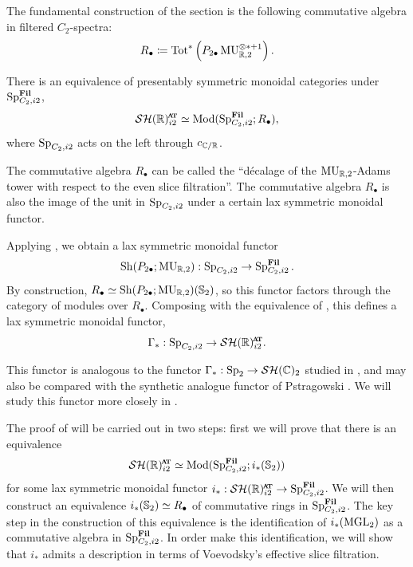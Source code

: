 The fundamental construction of the section is the following commutative algebra in filtered $C_2$-spectra:
\[ R_\bullet \coloneqq \mathrm{Tot}^* \left( P_{2\bullet} \operatorname{\mathrm{MU}}_{\mathbb{R},2}^{\otimes * + 1} \right). \]

\begin{thm} \label{thm:filt-model}
  There is an equivalence of presentably symmetric monoidal categories under $\operatorname{\mathrm{Sp}}_{C_2, i2} ^{\operatorname{\mathbf{Fil}}}$,
  \[\SHRat \simeq \Mod(\Sp^{\Fil}_{C_2, i2}; R_\bullet),\]
  where $\operatorname{\mathrm{Sp}}_{C_2, i2}$ acts on the left through $c_{\mathbb{C}/\mathbb{R}}$.
\end{thm}

The commutative algebra $R_\bullet$ can be called the ``d\'ecalage of the $\operatorname{\mathrm{MU}}_{\mathbb{R},2}$-Adams tower with respect to the even slice filtration''. The commutative algebra $R_\bullet$ is also the image of the unit in $\operatorname{\mathrm{Sp}}_{C_2,i2}$ under a certain lax symmetric monoidal functor.

\begin{cnstr} \label{cnstr:gamma-star}
  Applying , we obtain a lax symmetric monoidal functor
  \[ \mathrm{Sh}(P_{2\bullet} ; \operatorname{\mathrm{MU}}_{\mathbb{R},2}) : \operatorname{\mathrm{Sp}}_{C_2,i2} \to \operatorname{\mathrm{Sp}}^{\operatorname{\mathbf{Fil}}}_{C_2, i2}. \]
  By construction, $R_\bullet \simeq \mathrm{Sh}(P_{2\bullet} ; \operatorname{\mathrm{MU}}_{\mathbb{R},2})(\operatorname{\mathbb{S}}_2)$, so this functor factors through the category of modules over $R_\bullet$. Composing with the equivalence of , this defines a lax symmetric monoidal functor,
  \[ \Gamma_* :  \Sp_{C_2, i2} \to \SHRat. \]  
\end{cnstr}

This functor is analogous to the functor $\Gamma_* : \operatorname{\mathrm{Sp}}_{2} \to \mathcal{SH}(\mathbb{C})_{2}$ studied in \cite{cmmf}, and may also be compared with the synthetic analogue functor of Pstragowski \cite{Pstragowski}. We will study this functor more closely in .

The proof of  will be carried out in two steps: first we will prove that there is an equivalence
  \[\SHRat \simeq \Mod(\Sp^{\Fil}_{C_2, i2}; i_* (\Ss_2))\]
for some lax symmetric monoidal functor $i_* : \SHRat \to \Sp^{\Fil} _{C_2, i2}$.
We will then construct an equivalence $i_* (\operatorname{\mathbb{S}}_2) \simeq R_\bullet$ of commutative rings in $\operatorname{\mathrm{Sp}}^{\operatorname{\mathbf{Fil}}} _{C_2, i2}$.
The key step in the construction of this equivalence is the identification of $i_* (\mathrm{MGL}_2)$ as a commutative algebra in $\operatorname{\mathrm{Sp}}^{\operatorname{\mathbf{Fil}}} _{C_2, i2}$.
In order make this identification, we will show that $i_*$ admits a description in terms of Voevodsky's effective slice filtration.

